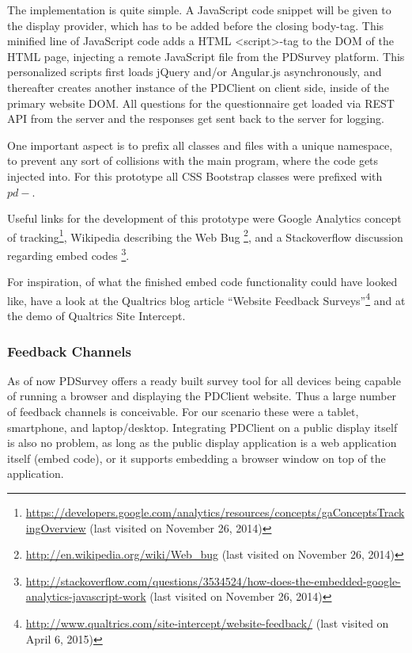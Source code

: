 		The implementation is quite simple. A JavaScript code snippet will be given to the display provider, which has to be added before the closing body-tag. This minified line of JavaScript code adds a HTML <script>-tag to the DOM of the HTML page, injecting a remote JavaScript file from the PDSurvey platform. This personalized scripts first loads jQuery and/or Angular.js asynchronously, and thereafter creates another instance of the PDClient on client side, inside of the primary website DOM. All questions for the questionnaire get loaded via REST API from the server and the responses get sent back to the server for logging.


		One important aspect is to prefix all classes and files with a unique namespace, to prevent any sort of collisions with the main program, where the code gets injected into. For this prototype all CSS Bootstrap classes were prefixed with $pd-$.

		Useful links for the development of this prototype were Google Analytics concept of tracking\footnote{\url{https://developers.google.com/analytics/resources/concepts/gaConceptsTrackingOverview} (last visited on November 26, 2014)}, Wikipedia describing the Web Bug \footnote{\url{http://en.wikipedia.org/wiki/Web_bug} (last visited on November 26, 2014)}, and a Stackoverflow discussion regarding embed codes \footnote{\url{http://stackoverflow.com/questions/3534524/how-does-the-embedded-google-analytics-javascript-work} (last visited on November 26, 2014)}.

		For inspiration, of what the finished embed code functionality could have looked like, have a look at the Qualtrics blog article ``Website Feedback Surveys''\footnote{\url{http://www.qualtrics.com/site-intercept/website-feedback/} (last visited on April 6, 2015)} and at the demo of Qualtrics Site Intercept.



	\subsubsection{Feedback Channels}

	As of now PDSurvey offers a ready built survey tool for all devices being capable of running a browser and displaying the PDClient website. Thus a large number of feedback channels is conceivable. For our scenario these were a tablet, smartphone, and laptop/desktop. Integrating PDClient on a public display itself is also no problem, as long as the public display application is a web application itself (embed code), or it supports embedding a browser window on top of the application. 

